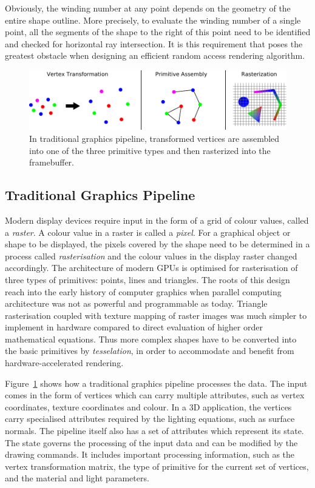\documentclass[11pt,a4paper,twoside]{article}
\begin{document}
Obviously, the winding number at any point depends on the geometry of the entire shape outline. More precisely, to evaluate the winding number of a single point, all the segments of the shape to the right of this point need to be identified and checked for horizontal ray intersection. It is this requirement that poses the greatest obstacle when designing an efficient random access rendering algorithm.

\begin {figure}
	\centering
	\includegraphics [width=1.0\columnwidth]{figures/gfx_pipeline}
	\caption {In traditional graphics pipeline, transformed vertices are assembled into one of the three primitive types and then rasterized into the framebuffer.}
	\label {fig:gfx_pipeline}
\end {figure}

\subsection{Traditional Graphics Pipeline}

Modern display devices require input in the form of a grid of colour values, called a \emph{raster}. A colour value in a raster is called a \emph{pixel}. For a graphical object or shape to be displayed, the pixels covered by the shape need to be determined in a process called \emph{rasterisation} and the colour values in the display raster changed accordingly. The architecture of modern GPUs is optimised for rasterisation of three types of primitives: points, lines and triangles. The roots of this design reach into the early history of computer graphics when parallel computing architecture was not as powerful and programmable as today. Triangle rasterisation coupled with texture mapping of raster images was much simpler to implement in hardware compared to direct evaluation of higher order mathematical equations. Thus more complex shapes have to be converted into the basic primitives by \emph{tesselation}, in order to accommodate and benefit from hardware-accelerated rendering.

Figure~\ref{fig:gfx_pipeline} shows how a traditional graphics pipeline processes the data. The input comes in the form of vertices which can carry multiple attributes, such as vertex coordinates, texture coordinates and colour. In a 3D application, the vertices carry specialised attributes required by the lighting equations, such as surface normals. The pipeline itself also has a set of attributes which represent its state. The state governs the processing of the input data and can be modified by the drawing commands. It includes important processing information, such as the vertex transformation matrix, the type of primitive for the current set of vertices, and the material and light parameters.
\end{document}
